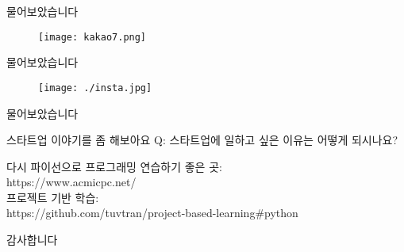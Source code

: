 \documentclass{beamer}
\begin{document}
\begin{frame}[fragile]{물어보았습니다}
\begin{figure}[H]
  \centering
    \texttt{[image: kakao7.png]}
\end{figure}
\end{frame}

\begin{frame}[fragile]{물어보았습니다}
\begin{figure}[H]
  \centering
    \texttt{[image: ./insta.jpg]}
\end{figure}
\end{frame}

\begin{frame}[fragile]{물어보았습니다}
\begin{figure}[H]
  \centering
\end{figure}
\end{frame}

\begin{frame}[fragile]{스타트업 이야기를 좀 해보아요}
Q: 스타트업에 일하고 싶은 이유는 어떻게 되시나요?
\end{frame}

\begin{frame}[fragile]{다시 파이선으로}
프로그래밍 연습하기 좋은 곳:\\
https://www.acmicpc.net/\\
프로젝트 기반 학습:\\
https://github.com/tuvtran/project-based-learning\#python
\end{frame}

\begin{frame}[fragile]
  \centering 감사합니다\\

\end{frame}
\end{document}
